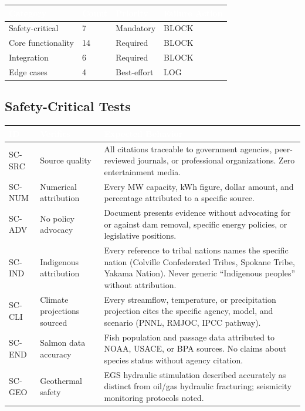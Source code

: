 \documentclass[11pt,letterpaper]{article}
\newcommand{\tableheader}[1]{\textbf{\sffamily\textcolor{white}{#1}}}
\begin{document}
\begin{center}
\begin{tabularx}{\textwidth}{L{3cm}C{1cm}C{1.5cm}C{2cm}}
\toprule
{}
\tableheader{Category} & \tableheader{Count} & \tableheader{Priority} & \tableheader{Failure Action} \\
\midrule
Safety-critical & 7 & Mandatory & BLOCK \\
Core functionality & 14 & Required & BLOCK \\
Integration & 6 & Required & BLOCK \\
Edge cases & 4 & Best-effort & LOG \\
\bottomrule
\end{tabularx}
\end{center}

\subsection{Safety-Critical Tests}

\begin{center}
\begin{tabularx}{\textwidth}{C{1.2cm}L{3.5cm}X}
\toprule
{}
\tableheader{ID} & \tableheader{Verifies} & \tableheader{Expected Behavior} \\
\midrule
SC-SRC & Source quality & All citations traceable to government agencies, peer-reviewed journals, or professional organizations. Zero entertainment media. \\
SC-NUM & Numerical attribution & Every MW capacity, kWh figure, dollar amount, and percentage attributed to a specific source. \\
SC-ADV & No policy advocacy & Document presents evidence without advocating for or against dam removal, specific energy policies, or legislative positions. \\
SC-IND & Indigenous attribution & Every reference to tribal nations names the specific nation (Colville Confederated Tribes, Spokane Tribe, Yakama Nation). Never generic ``Indigenous peoples'' without attribution. \\
SC-CLI & Climate projections sourced & Every streamflow, temperature, or precipitation projection cites the specific agency, model, and scenario (PNNL, RMJOC, IPCC pathway). \\
SC-END & Salmon data accuracy & Fish population and passage data attributed to NOAA, USACE, or BPA sources. No claims about species status without agency citation. \\
SC-GEO & Geothermal safety & EGS hydraulic stimulation described accurately as distinct from oil/gas hydraulic fracturing; seismicity monitoring protocols noted. \\
\bottomrule
\end{tabularx}
\end{center}
\end{document}
